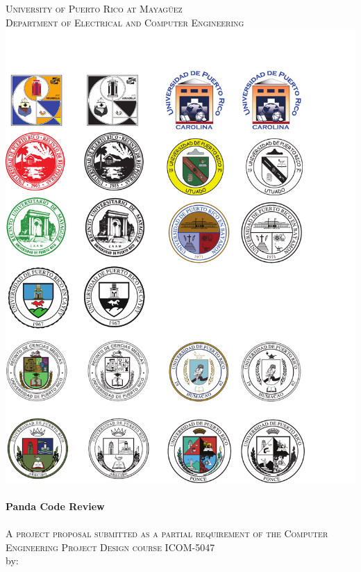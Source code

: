 \begin{titlepage}

\begin{center}


    

\textsc{\large University of Puerto Rico at Mayagüez}\\[0.3cm]
\textsc{\large Department of Electrical and Computer Engineering}\\[1cm]
\includegraphics[scale=1.25]{res/logo_rum}\\[1.2cm]


\HRule \\[0.4cm]
{ \huge \bfseries Panda Code Review}\\
\HRule \\[0.3cm]
\textsc{A project proposal submitted as a partial requirement of the Computer Engineering Project Design course ICOM-5047}\\[0.7cm]

by: \\[0.3cm]


\end{center}
\end{titlepage}
